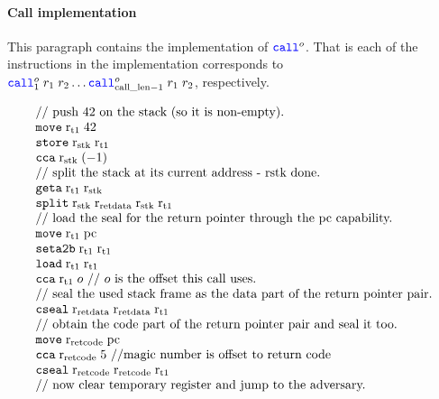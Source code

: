 \documentclass[a4paper]{article}
\begin{document}
\paragraph{Call implementation}
\label{par:call-impl}
This paragraph contains the implementation of $\scall{o}{}{}$. That is each of the instructions in the implementation corresponds to $\scall[1]{o}{r_1}{r_2} \dots \scall[\calllen-1]{o}{r_1}{r_2}$, respectively.

\[
  \begin{array}{l}
    \text{// push 42 on the stack (so it is non-empty).}\\
    \tmove{\rtmp{1}}{42}\\
    \tstore{\rstk}{\rtmp{1}}\\
    \tcca{\rstk}{(-1)}\\
    \text{// split the stack at its current address - rstk done.}\\
    \tgeta{\rtmp{1}}{\rstk}\\
    \tsplit{\rstk}{\rretd}{\rstk}{\rtmp{1}}\\
    \text{// load the seal for the return pointer through the pc capability.}\\
    \tmove{\rtmp{1}}{\pcreg}\\
    \tsetatob{\rtmp{1}}{\rtmp{1}}\\
    \tload{\rtmp{1}}{\rtmp{1}}\\
    \tcca{\rtmp{1}}{o}\text{ // $o$ is the offset this call uses.}\\
    \text{// seal the used stack frame as the data part of the return pointer pair.}\\
    \tcseal{\rretd}{\rretd}{\rtmp{1}}\\
    \text{// obtain the code part of the return pointer pair and seal it too.}\\
    \tmove{\rretc}{\pcreg}\\
    \tcca{\rretc}{5} \text{ //magic number is offset to return code}\\
    \tcseal{\rretc}{\rretc}{\rtmp{1}}\\
    \text{// now clear temporary register and jump to the adversary.}\\

\end{array}\]
\end{document}
